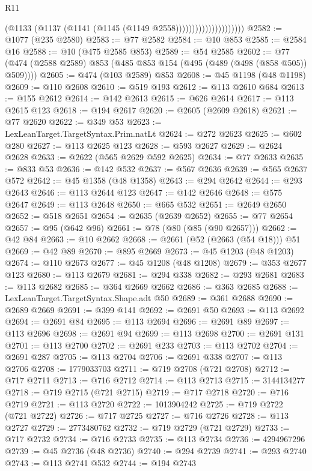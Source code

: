 \begin{lexlean}{R11}
\begin{coremodule}
{{{{{{{{{{{{{{{{{{{{{{{{{{{{{{{{{{{{{{{{{{{{{{{{{{{{{{{{{{{{{{{{{{{{{{{{{{{{{{{{{{{{{{{{{{{{{{{{{{{{{{{{{{                                    (@1133 (@1137 (@1141 (@1145 (@1149 @2558)))))))))))))))))))))
@2582 := @1077 (@235 @2580)
@2583 := @77 @2582
@2584 := @10 @853
@2585 := @2584 @16
@2588 := @10 (@475 @2585 @853)
@2589 := @54 @2585
@2602 := @77 (@474 (@2588 @2589) @853 (@485 @853 @154 (@495 (@489 (@498 (@858 @505)) @509))))
@2605 := @474 (@103 @2589) @853
@2608 := @45 @1198 (@48 @1198)
@2609 := @110 @2608
@2610 := @519 @193
@2612 := @113 @2610 @684
@2613 := @155 @2612
@2614 := @142 @2613
@2615 := @626 @2614
@2617 := @113 @2615 @123
@2618 := @194 @2617
@2620 := @2605 (@2609 @2618)
@2621 := @77 @2620
@2622 := @349 @53
@2623 := LexLeanTarget.TargetSyntax.Prim.natLt
@2624 := @272 @2623
@2625 := @602 @280
@2627 := @113 @2625 @123
@2628 := @593 @2627
@2629 := @2624 @2628
@2633 := @2622 (@565 @2629 @592 @2625)
@2634 := @77 @2633
@2635 := @833 @53
@2636 := @142 @532
@2637 := @567 @2636
@2639 := @565 @2637 @572
@2642 := @45 @1358 (@48 @1358)
@2643 := @294 @2642
@2644 := @293 @2643
@2646 := @113 @2644 @123
@2647 := @142 @2646
@2648 := @575 @2647
@2649 := @113 @2648
@2650 := @665 @532
@2651 := @2649 @2650
@2652 := @518 @2651
@2654 := @2635 (@2639 @2652)
@2655 := @77 @2654
@2657 := @95 (@642 @96)
@2661 := @78 (@80 (@85 (@90 @2657)))
@2662 := @42 @84
@2663 := @10 @2662
@2668 := @2661 (@52 (@2663 (@54 @18))) @51
@2669 := @42 @89
@2670 := @895 @2669
@2673 := @45 @1203 (@48 @1203)
@2674 := @110 @2673
@2677 := @45 @1208 (@48 @1208)
@2679 := @353 @2677 @123
@2680 := @113 @2679
@2681 := @294 @338
@2682 := @293 @2681
@2683 := @113 @2682
@2685 := @364 @2669 @2662
@2686 := @363 @2685
@2688 := LexLeanTarget.TargetSyntax.Shape.adt @50
@2689 := @361 @2688
@2690 := @2689 @2669
@2691 := @399 @141
@2692 := @2691 @50
@2693 := @113 @2692
@2694 := @2691 @84
@2695 := @113 @2694
@2696 := @2691 @89
@2697 := @113 @2696
@2698 := @2691 @94
@2699 := @113 @2698
@2700 := @2691 @131
@2701 := @113 @2700
@2702 := @2691 @233
@2703 := @113 @2702
@2704 := @2691 @287
@2705 := @113 @2704
@2706 := @2691 @338
@2707 := @113 @2706
@2708 := 1779033703
@2711 := @719 @2708 (@721 @2708)
@2712 := @717 @2711
@2713 := @716 @2712
@2714 := @113 @2713
@2715 := 3144134277
@2718 := @719 @2715 (@721 @2715)
@2719 := @717 @2718
@2720 := @716 @2719
@2721 := @113 @2720
@2722 := 1013904242
@2725 := @719 @2722 (@721 @2722)
@2726 := @717 @2725
@2727 := @716 @2726
@2728 := @113 @2727
@2729 := 2773480762
@2732 := @719 @2729 (@721 @2729)
@2733 := @717 @2732
@2734 := @716 @2733
@2735 := @113 @2734
@2736 := 4294967296
@2739 := @45 @2736 (@48 @2736)
@2740 := @294 @2739
@2741 := @293 @2740
@2743 := @113 @2741 @532
@2744 := @194 @2743
}}}}}}}}}}}}}}}}}}}}}}}}}}}}}}}}}}}}}}}}}}}}}}}}}}}}}}}}}}}}}}}}}}}}}}}}}}}}}}}}}}}}}}}}}}}}}}}}}}}}}}}}}}
\end{coremodule}
\end{lexlean}
